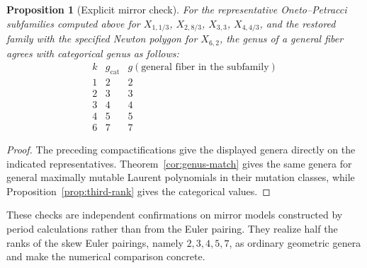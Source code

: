 \documentclass[11pt]{article}
\theoremstyle{plain}
\newtheorem{proposition}[theorem]{Proposition}
\theoremstyle{definition}
\theoremstyle{remark}
\newcommand{\1}{\mathbf 1}
\begin{document}
\begin{proposition}[Explicit mirror check]\label{prop:explicit-mirror-check}
For the representative Oneto--Petracci subfamilies computed above for $X_{1,1/3}$, $X_{2,8/3}$, $X_{3,3}$, $X_{4,4/3}$, and the restored family with the specified Newton polygon for $X_{6,2}$, the genus of a general fiber agrees with categorical genus as follows:
\[
\begin{array}{c|c|c}
k&g_{\mathrm{cat}}&g(\text{general fiber in the subfamily})\\\hline
1&2&2\\2&3&3\\3&4&4\\4&5&5\\6&7&7
\end{array}
\]
\end{proposition}

\begin{proof}
The preceding compactifications give the displayed genera directly on the indicated representatives.  Theorem~\ref{cor:genus-match} gives the same genera for general maximally mutable Laurent polynomials in their mutation classes, while Proposition~\ref{prop:third-rank} gives the categorical values.
\end{proof}

These checks are independent confirmations on mirror models constructed by period calculations rather than from the Euler pairing.  They realize half the ranks of the skew Euler pairings, namely $2,3,4,5,7$, as ordinary geometric genera and make the numerical comparison concrete.
\end{document}
